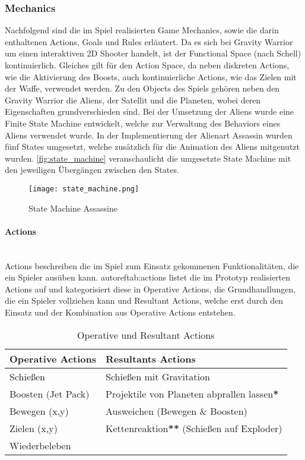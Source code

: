 \documentclass[11pt]{scrartcl}
\newcommand{\lbparagraph}[1]{\paragraph*{#1}\mbox{}\\}
\begin{document}
\subsubsection{Mechanics}
\label{subsec:mec}
Nachfolgend sind die im Spiel realisierten Game Mechanics, sowie die darin enthaltenen Actions, Goals und Rules erläutert. Da es sich bei Gravity Warrior um einen interaktiven 2D Shooter handelt, ist der Functional Space (nach Schell) kontinuierlich. Gleiches gilt für den Action Space, da neben diskreten Actions, wie die Aktivierung des Boosts, auch kontinuierliche Actions, wie das Zielen mit der Waffe, verwendet werden. Zu den Objects des Spiels gehören neben den Gravity Warrior die Aliens, der Satellit und die Planeten, wobei deren Eigenschaften grundverschieden sind. Bei der Umsetzung der Aliens wurde eine Finite State Machine entwickelt, welche zur Verwaltung des Behaviors eines Aliens verwendet wurde. In der Implementierung der Alienart Assassin wurden fünf States umgesetzt, welche zusätzlich für die Animation des Aliens mitgenutzt wurden. \autoref{fig:state_machine} veranschaulicht die umgesetzte State Machine mit den jeweiligen Übergängen zwischen den States.

\begin{figure}[htp]
	\centering
	\texttt{[image: state\_machine.png]}
	\caption{State Machine Assassine}
	\label{fig:state_machine}
\end{figure}

\lbparagraph{Actions}
Actions beschreiben die im Spiel zum Einsatz gekommenen Funktionalitäten, die ein Spieler ausüben kann. autoref{tab:actions} listet die im Prototyp realisierten Actions auf und kategorisiert diese in Operative Actions, die Grundhandlungen, die ein Spieler vollziehen kann und Resultant Actions, welche erst durch den Einsatz und der Kombination aus Operative Actions entstehen.


\begin{table}[htp]
\centering
\begin{tabular}{|l|l|}
\hline
\textbf{Operative Actions}&\textbf{Resultants Actions} \\
\hline
Schießen&Schießen mit Gravitation \\
\hline
Boosten (Jet Pack)&Projektile von Planeten abprallen lassen\textbf{*}\\
\hline
Bewegen (x,y)&Ausweichen (Bewegen \& Boosten)\\
\hline
Zielen (x,y)&Kettenreaktion\textbf{**} (Schießen auf Exploder)\\
\hline
Wiederbeleben&\\
\hline
\end{tabular}
\caption{Operative und Resultant Actions}
\label{tab:actions}
\end{table}
\end{document}

